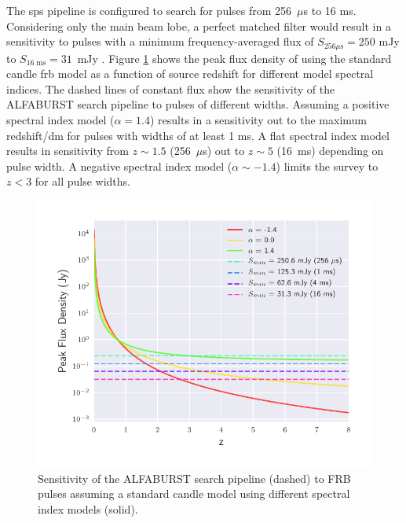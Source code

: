 \documentclass[a4paper,fleqn,usenatbib]{mnras}
\begin{document}
The \gls{sps} pipeline is configured to search for pulses from 256~$\mu$s to 16
ms. Considering only the main beam lobe, a perfect matched filter would result
in a sensitivity to pulses with a minimum frequency-averaged flux of $S_{256 \mu\textrm{s}} = 250$
mJy to $S_{16 \; \textrm{ms}} = 31$~mJy \citep{2015MNRAS.452.1254K}. Figure
\ref{fig:fwhm_sefd_z} shows the peak flux density of using the standard candle
\gls{frb} model as a function of source redshift for different model spectral
indices. The dashed lines of constant flux show the sensitivity of the ALFABURST
search pipeline to pulses of different widths. Assuming a positive spectral
index model ($\alpha=1.4$) results in a sensitivity out to the maximum
redshift/\gls{dm} for pulses with widths of at least 1 ms. A flat spectral index
model results in sensitivity from $z \sim 1.5$ (256~$\mu$s) out to $z \sim 5$
(16~ms) depending on pulse width. A negative spectral index model ($\alpha \sim
-1.4$) limits the survey to $z < 3$ for all pulse widths.

\begin{figure}
    \includegraphics[width=1.0\linewidth]{figures/fwhm_sefd_z_relation.pdf}
    \caption{Sensitivity of the ALFABURST search pipeline (dashed) to FRB pulses
    assuming a standard candle model using different spectral index models
    (solid).
    }
    \label{fig:fwhm_sefd_z}
\end{figure}
\end{document}
